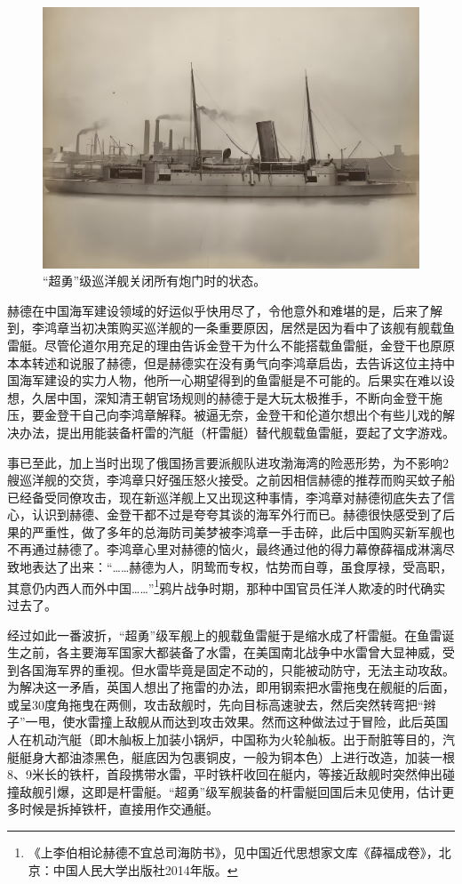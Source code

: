 \documentclass[12pt,UTF8]{ctexbook}
\begin{document}
\begin{figure}[htbp]
	\centering
	\includegraphics[width=1\linewidth]{Images/30}
	\caption{“超勇”级巡洋舰关闭所有炮门时的状态。}
	\label{fig:1}
\end{figure}

赫德在中国海军建设领域的好运似乎快用尽了，令他意外和难堪的是，后来了解到，李鸿章当初决策购买巡洋舰的一条重要原因，居然是因为看中了该舰有舰载鱼雷艇。尽管伦道尔用充足的理由告诉金登干为什么不能搭载鱼雷艇，金登干也原原本本转述和说服了赫德，但是赫德实在没有勇气向李鸿章启齿，去告诉这位主持中国海军建设的实力人物，他所一心期望得到的鱼雷艇是不可能的。后果实在难以设想，久居中国，深知清王朝官场规则的赫德于是大玩太极推手，不断向金登干施压，要金登干自己向李鸿章解释。被逼无奈，金登干和伦道尔想出个有些儿戏的解决办法，提出用能装备杆雷的汽艇（杆雷艇）替代舰载鱼雷艇，耍起了文字游戏。

事已至此，加上当时出现了俄国扬言要派舰队进攻渤海湾的险恶形势，为不影响2艘巡洋舰的交货，李鸿章只好强压怒火接受。之前因相信赫德的推荐而购买蚊子船已经备受同僚攻击，现在新巡洋舰上又出现这种事情，李鸿章对赫德彻底失去了信心，认识到赫德、金登干都不过是夸夸其谈的海军外行而已。赫德很快感受到了后果的严重性，做了多年的总海防司美梦被李鸿章一手击碎，此后中国购买新军舰也不再通过赫德了。李鸿章心里对赫德的恼火，最终通过他的得力幕僚薛福成淋漓尽致地表达了出来：“……赫德为人，阴鸷而专权，怙势而自尊，虽食厚禄，受高职，其意仍内西人而外中国……”\footnote{《上李伯相论赫德不宜总司海防书》，见中国近代思想家文库《薛福成卷》，北京：中国人民大学出版社2014年版。}鸦片战争时期，那种中国官员任洋人欺凌的时代确实过去了。

经过如此一番波折，“超勇”级军舰上的舰载鱼雷艇于是缩水成了杆雷艇。在鱼雷诞生之前，各主要海军国家大都装备了水雷，在美国南北战争中水雷曾大显神威，受到各国海军界的重视。但水雷毕竟是固定不动的，只能被动防守，无法主动攻敌。为解决这一矛盾，英国人想出了拖雷的办法，即用钢索把水雷拖曳在舰艇的后面，或呈30度角拖曳在两侧，攻击敌舰时，先向目标高速驶去，然后突然转弯把“辫子”一甩，使水雷撞上敌舰从而达到攻击效果。然而这种做法过于冒险，此后英国人在机动汽艇（即木舢板上加装小锅炉，中国称为火轮舢板。出于耐脏等目的，汽艇艇身大都油漆黑色，艇底因为包裹铜皮，一般为铜本色）上进行改造，加装一根8、9米长的铁杆，首段携带水雷，平时铁杆收回在艇内，等接近敌舰时突然伸出碰撞敌舰引爆，这即是杆雷艇。“超勇”级军舰装备的杆雷艇回国后未见使用，估计更多时候是拆掉铁杆，直接用作交通艇。
\end{document}
